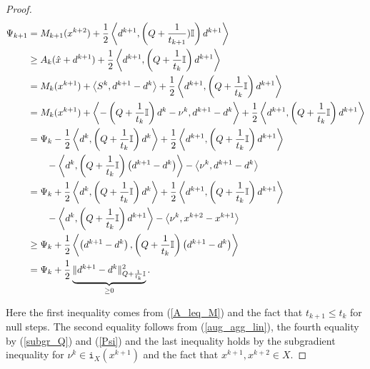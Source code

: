 \begin{proof}
\begin{equation}
\begin{split}
		\Psi_{k+1} &= M_{k+1}(x^{k+2})+\frac{1}{2}\left\langle d^{k+1},\left(Q+\frac{1}{t_{k+1}})\mathbb{I} \right)d^{k+1}\right\rangle \\
		&\geq A_k(\hat{x}+d^{k+1})+\frac{1}{2}\left\langle d^{k+1},\left(Q+\frac{1}{t_k}\mathbb{I}\right)d^{k+1}\right\rangle \\
		&= M_k(x^{k+1})+\left\langle S^k,d^{k+1}-d^{k} \right\rangle +\frac{1}{2}\left\langle d^{k+1},\left(Q+\frac{1}{t_k}\mathbb{I}\right)d^{k+1}\right\rangle \\
		&= M_k(x^{k+1})+\left\langle -\left( Q+\frac{1}{t_k}\mathbb{I}\right)d^k - \nu^k,d^{k+1}-d^{k} \right\rangle +\frac{1}{2}\left\langle d^{k+1},\left(Q+\frac{1}{t_k}\mathbb{I}\right)d^{k+1}\right\rangle \\
		&= \Psi_k - \frac{1}{2}\left\langle d^{k},\left(Q+\frac{1}{t_k}\mathbb{I}\right)d^{k}\right\rangle + \frac{1}{2}\left\langle d^{k+1},\left(Q+\frac{1}{t_k}\mathbb{I}\right)d^{k+1}\right\rangle \\
		& \qquad -\left\langle d^{k},\left(Q+\frac{1}{t_k}\mathbb{I}\right)\left(d^{k+1} - d^{k}\right)\right\rangle - \left\langle \nu^k, d^{k+1}-d^{k}\right\rangle\\
		&= \Psi_k + \frac{1}{2}\left\langle d^{k},\left(Q+\frac{1}{t_k}\mathbb{I}\right)d^{k}\right\rangle + \frac{1}{2}\left\langle d^{k+1},\left(Q+\frac{1}{t_k}\mathbb{I}\right)d^{k+1}\right\rangle \\
		& \qquad -\left\langle d^{k},\left(Q+\frac{1}{t_k}\mathbb{I}\right)d^{k+1}\right\rangle - \left\langle \nu^k, x^{k+2}-x^{k+1}\right\rangle\\
		&\geq \Psi_k + \frac{1}{2}\left\langle\left(d^{k+1}-d^{k}\right),\left(Q+\frac{1}{t_k}\mathbb{I}\right)\left(d^{k+1} - d^{k}\right)\right\rangle \\
		& =\Psi_k + \frac{1}{2}\underbrace{\Vert d^{k+1}-d^k\Vert^2_{Q+\frac{ 1}{t_k}\mathbb{I}}}_{\geq 0}.
	\label{Psi_increase}
\end{split}
\end{equation}
	
Here the first inequality comes from (\ref{A_leq_M}) and the fact that \(t_{k+1} \leq t_{k}\) for null steps. The second equality follows from (\ref{aug_agg_lin}), the fourth equality by (\ref{subgr_Q}) and (\ref{Psi}) and the last inequality holds by the subgradient inequality for \(\nu^k \in \mathtt{i}_X(x^{k+1})\) and the fact that \(x^{k+1},x^{k+2} \in X\).



\end{proof}
